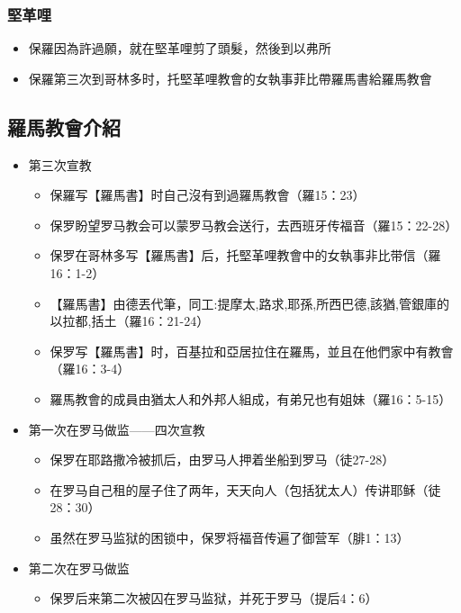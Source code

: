\subsubsection{堅革哩}
\begin{itemize}%
\itemsep-.25em 
\item 保羅因為許過願，就在堅革哩剪了頭髮，然後到以弗所
\item 保羅第三次到哥林多时，托堅革哩教會的女執事菲比帶羅馬書給羅馬教會
\end{itemize}

\subsection{羅馬教會介紹}
\begin{itemize}%
\itemsep-.25em 
\item 第三次宣教
\begin{itemize}%
\itemsep-.15em
\item 保羅写【羅馬書】时自己沒有到過羅馬教會（羅15：23）
\item 保罗盼望罗马教会可以蒙罗马教会送行，去西班牙传福音（羅15：22-28）
\item 保罗在哥林多写【羅馬書】后，托堅革哩教會中的女執事非比带信（羅16：1-2）
\item 【羅馬書】由德丟代筆，同工:提摩太,路求,耶孫,所西巴德,該猶,管銀庫的以拉都,括土（羅16：21-24）
\item 保罗写【羅馬書】时，百基拉和亞居拉住在羅馬，並且在他們家中有教會（羅16：3-4）
\item 羅馬教會的成員由猶太人和外邦人組成，有弟兄也有姐妹（羅16：5-15）
\end{itemize}
\item 第一次在罗马做监——四次宣教
\begin{itemize}%
\itemsep-.25em
\item 保罗在耶路撒冷被抓后，由罗马人押着坐船到罗马（徒27-28）
\item 在罗马自己租的屋子住了两年，天天向人（包括犹太人）传讲耶稣（徒28：30）
\item 虽然在罗马监狱的困锁中，保罗将福音传遍了御营军（腓1：13）
\end{itemize}
\item 第二次在罗马做监
\begin{itemize}%
\itemsep-.25em
\item 保罗后来第二次被囚在罗马监狱，并死于罗马（提后4：6）
\end{itemize}
\end{itemize}
